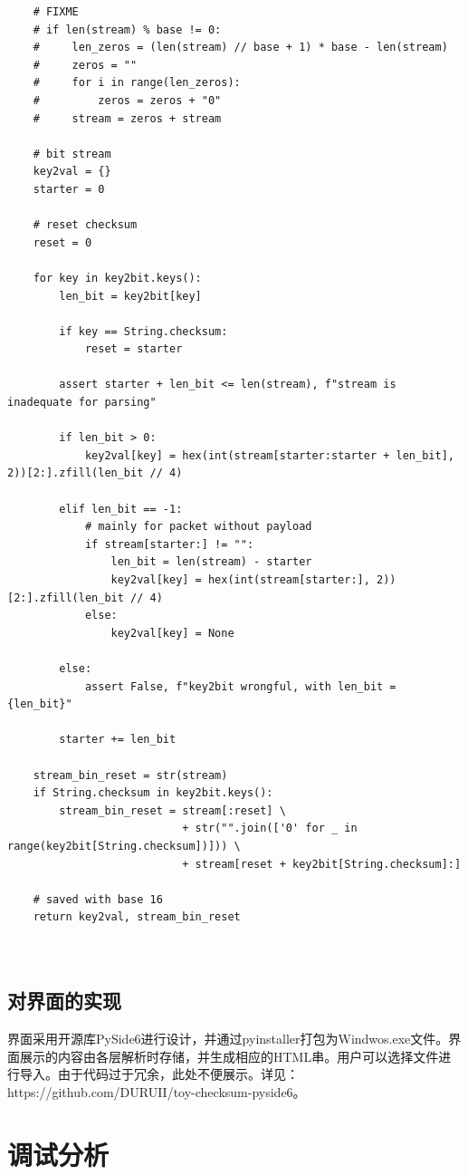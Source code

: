 \documentclass[a4paper,11pt]{article}
\begin{document}
\begin{spacing}{1.2}
\begin{CJK}{UTF8}{gbsn}
\begin{lstlisting}
    # FIXME 
    # if len(stream) % base != 0:
    #     len_zeros = (len(stream) // base + 1) * base - len(stream)
    #     zeros = ""
    #     for i in range(len_zeros):
    #         zeros = zeros + "0"
    #     stream = zeros + stream

    # bit stream
    key2val = {}
    starter = 0

    # reset checksum
    reset = 0

    for key in key2bit.keys():
        len_bit = key2bit[key]

        if key == String.checksum:
            reset = starter

        assert starter + len_bit <= len(stream), f"stream is inadequate for parsing"

        if len_bit > 0:
            key2val[key] = hex(int(stream[starter:starter + len_bit], 2))[2:].zfill(len_bit // 4)

        elif len_bit == -1:
            # mainly for packet without payload
            if stream[starter:] != "":
                len_bit = len(stream) - starter
                key2val[key] = hex(int(stream[starter:], 2))[2:].zfill(len_bit // 4)
            else:
                key2val[key] = None

        else:
            assert False, f"key2bit wrongful, with len_bit = {len_bit}"

        starter += len_bit

    stream_bin_reset = str(stream)
    if String.checksum in key2bit.keys():
        stream_bin_reset = stream[:reset] \
                           + str("".join(['0' for _ in range(key2bit[String.checksum])])) \
                           + stream[reset + key2bit[String.checksum]:]

    # saved with base 16
    return key2val, stream_bin_reset

	
\end{lstlisting}

\subsection{对界面的实现}

\noindent 界面采用开源库PySide6进行设计，并通过pyinstaller打包为Windwos.exe文件。界面展示的内容由各层解析时存储，并生成相应的HTML串。用户可以选择文件进行导入。由于代码过于冗余，此处不便展示。详见：https://github.com/DURUII/toy-checksum-pyside6。

\section{调试分析}


\end{CJK}
\end{spacing}
\end{document}
